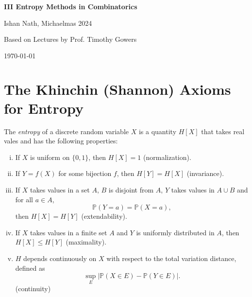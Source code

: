 \documentclass[12pt]{article}
\begin{document}
\hypersetup{pageanchor=false}
\begin{titlepage}
	\begin{center}
		\vspace*{1em}
		\Huge
		\textbf{III Entropy Methods in Combinatorics}

		\vspace{1em}
		\large
		Ishan Nath, Michaelmas 2024

		\vspace{1.5em}

		\Large

		Based on Lectures by Prof. Timothy Gowers

		\vspace{1em}

		\large
		\today
	\end{center}
	
\end{titlepage}
\hypersetup{pageanchor=true}

\tableofcontents

\newpage


\section{The Khinchin (Shannon) Axioms for Entropy}%
\label{sec:axioms}

The \emph{entropy} of a discrete random variable $X$ is a quantity $H[X]$ that takes real vales and has the following properties:
\begin{enumerate}[(i)]
	\item If $X$ is uniform on $\{0, 1\}$, then $H[X] = 1$ (normalization).
	\item If $Y = f(X)$ for some bijection $f$, then $H[Y] = H[X]$ (invariance).
	\item If $X$ takes values in a set $A$, $B$ is disjoint from $A$, $Y$ takes values in $A \cup B$ and for all $a \in A$,
		\[
		\mathbb{P}(Y = a) = \mathbb{P}(X = a),
		\]
		then $H[X] = H[Y]$ (extendability).
	\item If $X$ takes values in a finite set $A$ and $Y$ is uniformly distributed in $A$, then $H[X] \leq H[Y]$ (maximality).
	\item $H$ depends continuously on $X$ with respect to the total variation distance, defined as
		\[
		\sup_{E} \left| \mathbb{P}(X \in E) - \mathbb{P}(Y \in E)\right|.
		\]
		(continuity)
\end{enumerate}
\end{document}
